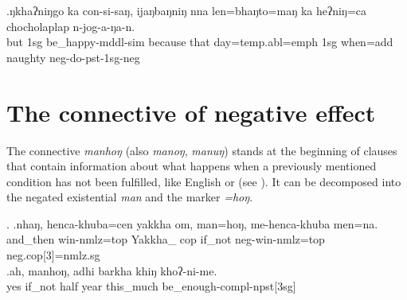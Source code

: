 \exg.ŋkhaʔniŋgo ka  con-si-saŋ,   ijaŋbaŋniŋ   nna  len=bhaŋto=maŋ      ka  heʔniŋ=ca        chocholaplap n-jog-a-ŋa-n.\\
	but {\sc 1sg}   be\_happy{\sc -mddl-sim} because that day{\sc =temp.abl=emph} {\sc 1sg} when{\sc =add} naughty {\sc neg-}do{\sc -pst-1sg-neg} \\
	 

\section{The connective of negative effect}

The connective \emph{manhoŋ} (also \emph{manoŋ}, \emph{manuŋ}) stands at the beginning of clauses that contain information about what happens when a previously mentioned condition has not been fulfilled, like English  or  (see \Next). It can be decomposed into the  negated existential  \emph{man} and the  marker \emph{=hoŋ}.

\ex. \ag.nhaŋ,    henca-khuba=cen yakkha          om, man=hoŋ, me-henca-khuba               men=na.\\
and\_then win{\sc -nmlz=top} Yakkha\_ {\sc cop} if\_not {\sc neg-}win{\sc -nmlz=top} {\sc neg.cop[3]=nmlz.sg}\\
 
\bg.ah,    manhoŋ,  adhi barkha khiŋ     khoʔ-ni-me.\\
yes if\_not half year this\_much be\_enough{\sc -compl-npst[3sg]}\\
 



